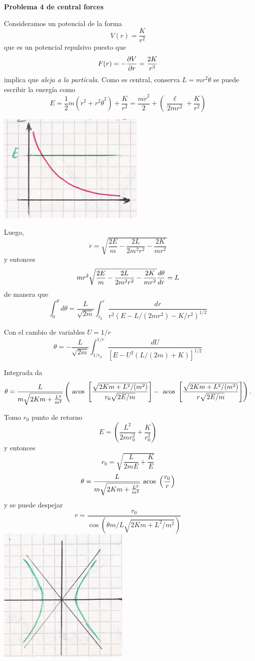 \documentclass[10pt,oneside]{CBFT_book}
\begin{document}
\begin{ejemplo}{\bf Problema 4 de central forces}

Consideramos un potencial de la forma 
\[
	V(r) = \frac{K}{r^2}
\]
que es un potencial repulsivo puesto que 
\[
	F(r) = -\frac{\partial^{\hspace{-0.05em}} {V}}{\partial {r}^{\hspace{-0.05em}}} = \frac{2K}{r^3}
\]
implica que {\it aleja a la partícula}.
Como es central, conserva $ L = m r^2 \dot{\theta} $ se puede escribir la energía como
\[
	E = \frac 1 2 m ( \dot{r}^2 + r^2 \dot{\theta}^2 ) + \frac K {r^2} = \frac{ m \dot{r}^2 }{2} +
	\left( \frac{ \ell }{ 2 m r^2 } + \frac{ K }{ r^2 } \right)
\]

\includegraphics[scale=0.3]{images/fig_mc_potencial_central_4.jpg}

Luego,
\[
	\dot{r} = \sqrt{ \frac{2E}{m} - \frac{2L}{2m^2r^2} - \frac{2K}{mr^2} }
\]
y entonces
\[
	m r^2 \sqrt{ \frac{2E}{m} - \frac{2L}{2m^2r^2} - \frac{2K}{mr^2} } \frac{d^{\hspace{-0.05em}} {\theta}}{d {r}^{\hspace{-0.05em}}} = L
\]
de manera que 
\[
	\int_0^{\theta} d\theta = \frac{L}{\sqrt{2m}} \int_{r_0}^{r} \frac{dr}{r^2( E - L/(2mr^2) - K/r^2 )^{1/2}}
\]

Con el cambio de variables $ U = 1 / r $
\[
	\theta = -\frac{L}{\sqrt{2m}} \int_{1/r_0}^{1/r} \frac{ dU }{ [ E - U^2( L/(2m) + K )]^{1/2} }
\]

Integrada da
\[
	\theta = \frac{L}{m\sqrt{2Km + \frac{L^2}{m^2}}}
	\left( \text{ acos }\left[ \frac{ \sqrt{2Km + L^2/(m^2)} }{r_0\sqrt{2E/m}} \right] - 
	\text{ acos }\left[ \frac{\sqrt{2Km + L^2/(m^2)}}{r\sqrt{2E/m}}\right] \right).
\]

Tomo $r_0$ punto de retorno
\[
	E = \left( \frac{L^2}{2mr_0^2} + \frac{K}{r_0^2} \right)
\]
y entonces
\[
	r_0 = \sqrt{ \frac L {2mE} + \frac K E }
\]
\[
	\theta = \frac{L}{m\sqrt{2Km + \frac{L^2}{m^2}}} \text{ acos }\left(\frac{r_0}{r}\right)
\]
y se puede despejar
\[
	r = \frac{r_0}{\cos( \theta m/L \sqrt{ 2Km + L^2/m^2 } )}
\]
\includegraphics[scale=0.3]{images/fig_mc_potencial_central_4_orbitas.jpg}

\end{ejemplo}
\end{document}
